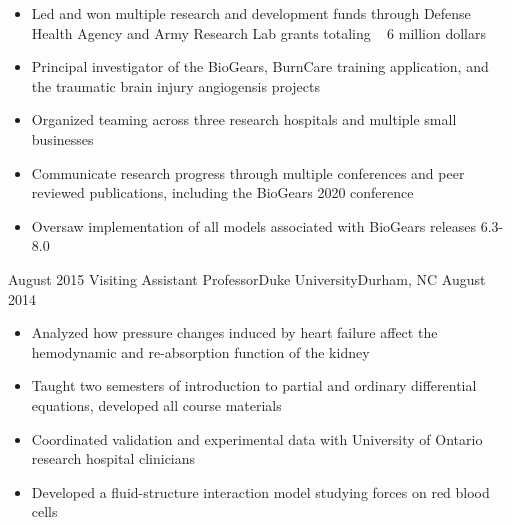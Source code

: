 \begin{experiences}
{\begin{itemize}
                        \item Led and won multiple research and development funds through Defense Health Agency and Army Research Lab grants totaling ~ 6 million dollars  
                        \item Principal investigator of the BioGears, BurnCare training application, and the traumatic brain injury angiogensis projects                
                        \item Organized teaming across three research hospitals and multiple small businesses
                        \item Communicate research progress through multiple conferences and peer reviewed publications, including the BioGears 2020 conference
                        \item Oversaw implementation of all models associated with BioGears releases 6.3-8.0                                                                   
                      \end{itemize}
                    }
                    {}
  \emptySeparator
  \experience
    {August 2015}     {Visiting Assistant Professor}{Duke University}{Durham, NC}
    {August 2014}    {
                      \begin{itemize}
                        \item Analyzed how pressure changes induced by heart failure affect the hemodynamic and re-absorption function of the kidney
                        \item Taught two semesters of introduction to partial and ordinary differential equations, developed all course materials                
                        \item Coordinated validation and experimental data with University of Ontario research hospital clinicians                   
                        \item Developed a fluid-structure interaction model studying forces on red blood cells 
                      \end{itemize}
                    }
                    {}

\end{experiences}
